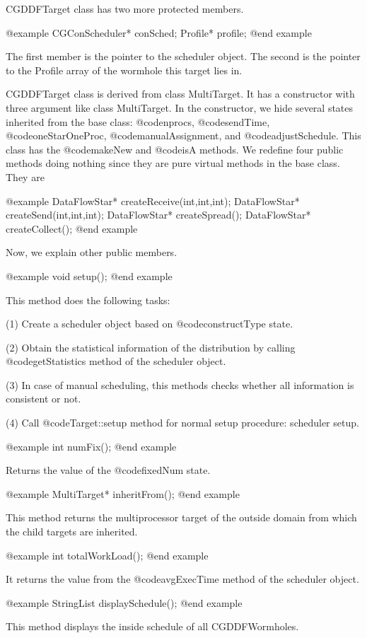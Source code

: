 {CGDDFTarget class has two more protected members.

@example
CGConScheduler* conSched;
Profile* profile;
@end example

The first member is the pointer to the scheduler object. The second is
the pointer to the Profile array of the wormhole this target lies in.

CGDDFTarget class is derived from class MultiTarget. It has a constructor
with three argument like class MultiTarget. In the constructor, we hide
several states inherited from the base class: @code{nprocs}, @code{sendTime},
@code{oneStarOneProc}, @code{manualAssignment}, and @code{adjustSchedule}.
This class has the @code{makeNew} and @code{isA} methods. We redefine four
public methods doing nothing since they are pure virtual methods in the
base class. They are

@example
DataFlowStar* createReceive(int,int,int);
DataFlowStar* createSend(int,int,int);
DataFlowStar* createSpread();
DataFlowStar* createCollect();
@end example

Now, we explain other public members.

@example
void setup();
@end example

This method does the following tasks:

(1) Create a scheduler object based on @code{constructType} state.

(2) Obtain the statistical information of the distribution by calling
@code{getStatistics} method of the scheduler object.

(3) In case of manual scheduling, this methods checks whether all
information is consistent or not. 

(4) Call @code{Target::setup} method for normal setup procedure: scheduler
setup.

@example
int numFix();
@end example

Returns the value of the @code{fixedNum} state.

@example
MultiTarget* inheritFrom();
@end example

This method returns the multiprocessor target of the outside domain from
which the child targets are inherited.

@example
int totalWorkLoad();
@end example

It returns the value from the @code{avgExecTime} method of the scheduler
object.

@example
StringList displaySchedule();
@end example

This method displays the inside schedule of all CGDDFWormholes.

}
